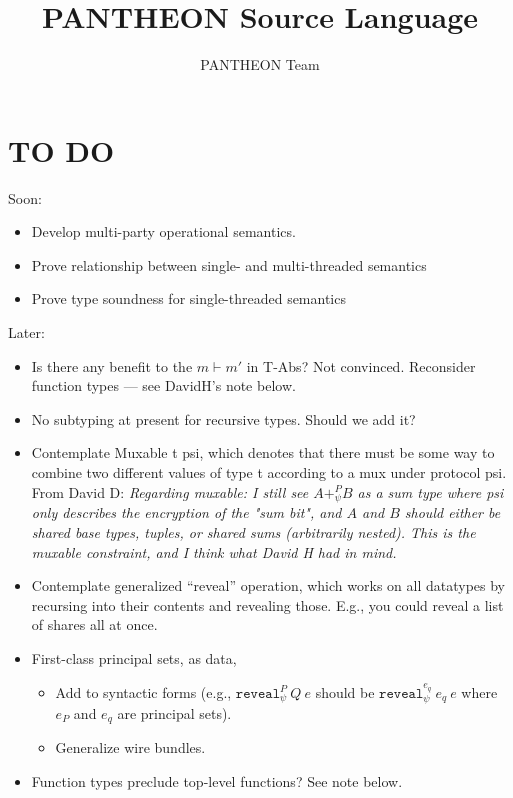 \documentclass[10pt]{article}
\title{PANTHEON Source Language}
\author{PANTHEON Team}
\newcommand{\kw}[1]{\ensuremath{\mathtt{#1}}}
\newcommand{\ereveal}[4]{\ensuremath{\kw{reveal}^{#1}_{#4}~{#2}~{#3}}}
\begin{document}
\maketitle

\section{TO DO}

Soon:
\begin{itemize}
\item Develop multi-party operational semantics.
\item Prove relationship between single- and multi-threaded semantics
\item Prove type soundness for single-threaded semantics
\end{itemize}


\noindent
Later:
\begin{itemize}
\item Is there any benefit to the $m \vdash m'$ in T-Abs? Not
  convinced. Reconsider function types --- see DavidH's note below.
\item No subtyping at present for recursive types. Should we add
  it?
\item Contemplate Muxable t psi, which denotes that there must be some
  way to combine two different values of type t according to a mux
  under protocol psi. From David D: \emph{Regarding muxable: I still see $A +^P_{\psi} B$ as a sum type where psi only describes the encryption of the "sum bit", and $A$ and $B$ should either be shared base types, tuples, or shared sums (arbitrarily nested). This is the muxable constraint, and I think what David H had in mind.}
\item Contemplate generalized ``reveal'' operation, which works on all
  datatypes by recursing into their contents and revealing
  those. E.g., you could reveal a list of shares all at once.
\item First-class principal sets, as data,
  \begin{itemize}
    \item Add to syntactic forms (e.g., $\ereveal{P}{Q}{e}{\psi}$ should be
    $\ereveal{e_q}{e_q}{e}{\psi}$ where $e_P$ and $e_q$ are principal
    sets).
  \item Generalize wire bundles.
  \end{itemize}
\item Function types preclude top-level functions? See note below.
\end{itemize}
\end{document}
